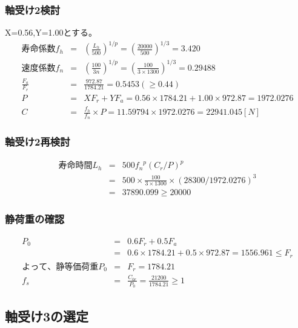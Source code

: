 \documentclass[a4j,twoside,openright,11pt]{jreport}
\begin{document}
\subsubsection{軸受け2検討}
X=0.56,Y=1.00とする。
\begin{eqnarray}
寿命係数f_h &=& \left( \frac{L_h}{500} \right)^{1/p} = \left( \frac{20000}{500} \right)^{1/3} = 3.420\\
速度係数f_n &=& \left( \frac{100}{3n} \right)^{1/p} = \left( \frac{100}{3 \times 1300} \right)^{1/3} = 0.29488\\
\frac{F_a}{F_r} &=& \frac{972.87}{1784.21} = 0.5453(\geq 0.44)\\
P &=& XF_r+YF_a = 0.56 \times 1784.21 + 1.00 \times 972.87 = 1972.0276\\
C &=& \frac{f_h}{f_n} \times P = 11.59794 \times 1972.0276 = 22941.045[N]
\end{eqnarray}

\subsubsection{軸受け2再検討}
\begin{eqnarray}
寿命時間L_h &=& 500{f_n}^p(C_r/P)^p\\
           &=& 500 \times \frac{100}{3 \times 1300} \times (28300/1972.0276)^3\\
           &=& 37890.099 \geq 20000
\end{eqnarray}

\subsubsection{静荷重の確認}
\begin{eqnarray}
P_0&=&0.6F_r+0.5F_a\\
&=&0.6 \times 1784.21 + 0.5 \times 972.87 = 1556.961 \leq F_r\\
よって、静等価荷重P_0 &=& F_r =1784.21\\
f_s &=& \frac{C_{0r}}{P_0} = \frac{21200}{1784.21}\geq 1
\end{eqnarray}











\newpage
\subsection{軸受け3の選定}
\end{document}
